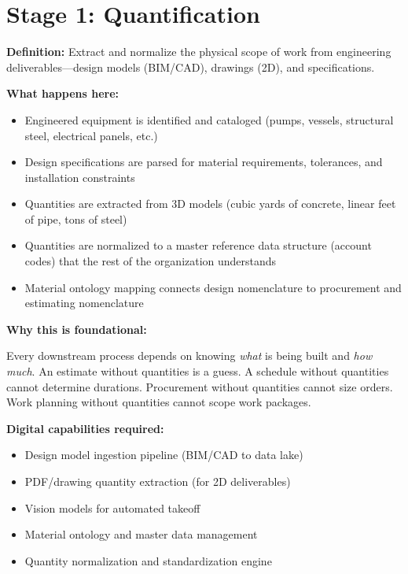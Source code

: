 \documentclass[11pt, letterpaper]{article}
\begin{document}
\vspace{1.5em}

\section*{Stage 1: Quantification}

\textbf{Definition:} Extract and normalize the physical scope of work from engineering deliverables---design models (BIM/CAD), drawings (2D), and specifications.

\textbf{What happens here:}
\begin{itemize}
    \item Engineered equipment is identified and cataloged (pumps, vessels, structural steel, electrical panels, etc.)
    \item Design specifications are parsed for material requirements, tolerances, and installation constraints
    \item Quantities are extracted from 3D models (cubic yards of concrete, linear feet of pipe, tons of steel)
    \item Quantities are normalized to a master reference data structure (account codes) that the rest of the organization understands
    \item Material ontology mapping connects design nomenclature to procurement and estimating nomenclature
\end{itemize}

\textbf{Why this is foundational:}

Every downstream process depends on knowing \textit{what} is being built and \textit{how much}. An estimate without quantities is a guess. A schedule without quantities cannot determine durations. Procurement without quantities cannot size orders. Work planning without quantities cannot scope work packages.

\textbf{Digital capabilities required:}
\begin{itemize}
    \item Design model ingestion pipeline (BIM/CAD to data lake)
    \item PDF/drawing quantity extraction (for 2D deliverables)
    \item Vision models for automated takeoff
    \item Material ontology and master data management
    \item Quantity normalization and standardization engine
\end{itemize}
\end{document}

